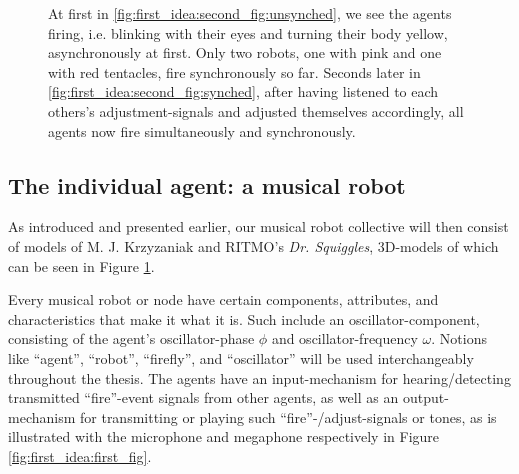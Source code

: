\begin{figure}[ht!]
{		At first in \ref{fig:first_idea:second_fig:unsynched}, we see the agents firing, i.e. blinking with their eyes and turning their body yellow, asynchronously at first. Only two robots, one with pink and one with red tentacles, fire synchronously so far. Seconds later in \ref{fig:first_idea:second_fig:synched}, after having listened to each others's adjustment-signals and adjusted themselves accordingly, all agents now fire simultaneously and synchronously.}
		\label{fig:first_idea:second_fig}
	\end{figure}






	
	\subsection{The individual agent: a musical robot}
	\label{subsec:agent}
		As introduced and presented earlier, our musical robot collective will then consist of models of M. J. Krzyzaniak and RITMO's \textit{Dr. Squiggles}, 3D-models of which can be seen in Figure \ref{fig:first_idea:second_fig}.
	
		Every musical robot or node have certain components, attributes, and characteristics that make it what it is. Such include an oscillator-component, consisting of the agent's oscillator-phase $\phi$ and oscillator-frequency $\omega$. Notions like ``agent'', ``robot'', ``firefly'', and ``oscillator'' will be used interchangeably throughout the thesis. The agents have an input-mechanism for hearing/detecting transmitted ``fire''-event signals from other agents, as well as an output-mechanism for transmitting or playing such ``fire''-/adjust-signals or tones, as is illustrated with the microphone and megaphone respectively in Figure \ref{fig:first_idea:first_fig}.
		
